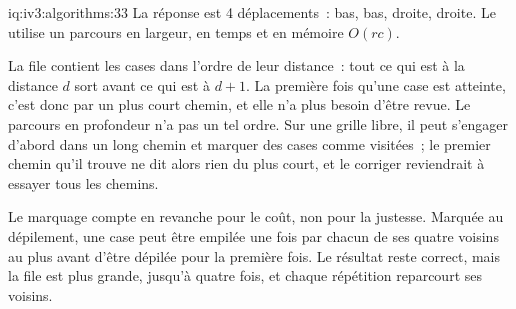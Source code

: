 \begin{solution}{iq:iv3:algorithms:33}
La réponse est 4 déplacements~: bas, bas, droite, droite. Le  utilise un parcours en largeur, en temps et en mémoire $O(rc)$.
\enlargethispage{-3\baselineskip}%
\label{lst:iv3:al:grid}

La file contient les cases dans l'ordre de leur distance~: tout ce qui est à la distance $d$ sort avant ce qui est à $d + 1$. La première fois qu'une case est atteinte, c'est donc par un plus court chemin, et elle n'a plus besoin d'être revue. Le parcours en profondeur n'a pas un tel ordre. Sur une grille libre, il peut s'engager d'abord dans un long chemin et marquer des cases comme visitées~; le premier chemin qu'il trouve ne dit alors rien du plus court, et le corriger reviendrait à essayer tous les chemins.

Le marquage compte en revanche pour le coût, non pour la justesse. Marquée au dépilement, une case peut être empilée une fois par chacun de ses quatre voisins au plus avant d'être dépilée pour la première fois. Le résultat reste correct, mais la file est plus grande, jusqu'à quatre fois, et chaque répétition reparcourt ses voisins.

\end{solution}

